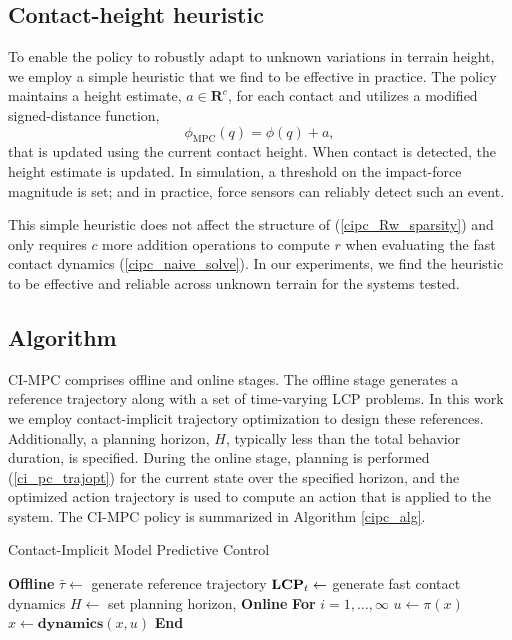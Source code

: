 \subsection{Contact-height heuristic}
To enable the policy to robustly adapt to unknown variations in terrain height, we employ a simple heuristic that we find to be effective in practice. The policy maintains a height estimate, $a \in \mathbf{R}^c$, for each contact and utilizes a modified signed-distance function, 
\begin{equation}
	\phi_{\mbox{MPC}}(q) = \phi(q) + a,
\end{equation}
that is updated using the current contact height. When contact is detected, the height estimate is updated. In simulation, a threshold on the impact-force magnitude is set; and in practice, force sensors can reliably detect such an event.

This simple heuristic does not affect the structure of (\ref{cipc_Rw_sparsity}) and only requires $c$ more addition operations to compute $r$ when evaluating the fast contact dynamics (\ref{cipc_naive_solve}). In our experiments, we find the heuristic to be effective and reliable across unknown terrain for the systems tested.

\subsection{Algorithm}
CI-MPC comprises offline and online stages. The offline stage generates a reference trajectory along with a set of time-varying LCP problems. In this work we employ contact-implicit trajectory optimization \cite{manchester2020variational} to design these references. Additionally, a planning horizon, $H$, typically less than the total behavior duration, is specified. During the online stage, planning is performed (\ref{ci_pc_trajopt}) for the current state over the specified horizon, and the optimized action trajectory is used to compute an action that is applied to the system. The CI-MPC policy is summarized in Algorithm \ref{cipc_alg}. 

\begin{algorithm}[H]
	\caption{Contact-Implicit Model Predictive  Control}\label{cipc_alg}
	\begin{algorithmic}[1]
		\State \textbf{Offline}  
		\State \indent $\bar{\tau} \leftarrow$ generate reference trajectory
		\State \indent $\mbox{\textbf{LCP}}_t \leftarrow$ generate fast contact dynamics
		\State \indent $H \leftarrow$ set planning horizon, 
		\State \textbf{Online}  
		\State \indent \textbf{For} $i = 1, \ldots, \infty$
		\State \indent \indent $u \leftarrow \pi(x)$  
		\State \indent \indent $x \leftarrow \textbf{dynamics}(x, u)$
		\State \indent \textbf{End} 
	\end{algorithmic}
\end{algorithm}

